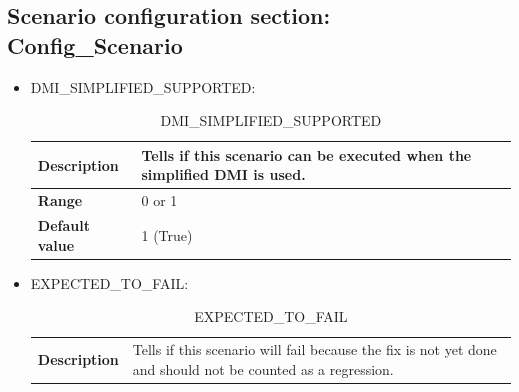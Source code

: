 \subsection{Scenario configuration section: Config\_Scenario}
	\begin{itemize}
			\item DMI\_SIMPLIFIED\_SUPPORTED:

			\begin{longtable}{|l|l|}
				\caption{DMI\_SIMPLIFIED\_SUPPORTED}\\
				\hline

					\begin{minipage}[t]{0.22\linewidth} \textbf{Description}	\end{minipage}
				&	\begin{minipage}[t]{0.78\linewidth} Tells if this scenario can be executed when the simplified DMI is used. \end{minipage} \\

				\hline

					\begin{minipage}[t]{0.22\linewidth} \textbf{Range}	\end{minipage}
				&	\begin{minipage}[t]{0.78\linewidth} 0 or 1 \end{minipage} \\

				\hline

					\begin{minipage}[t]{0.22\linewidth} \textbf{Default value}	\end{minipage}
				&	\begin{minipage}[t]{0.78\linewidth} 1 (True) \end{minipage} \\

				\hline
			\end{longtable}

			\item EXPECTED\_TO\_FAIL:

			\begin{longtable}{|l|l|}
				\caption{EXPECTED\_TO\_FAIL}\\
				\hline

					\begin{minipage}[t]{0.22\linewidth} \textbf{Description}	\end{minipage}
				&	\begin{minipage}[t]{0.78\linewidth} Tells if this scenario will fail because the fix is not yet done and should not be counted as a regression. \end{minipage} \\


\end{longtable}
\end{itemize}
